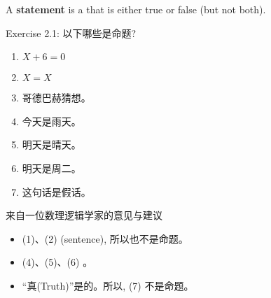 
\begin{frame}{}
\end{frame}

\begin{frame}{}
  \begin{definition}
    A \textbf{statement} is a  that is either true or false
    (but not both).
  \end{definition}

  \vspace{0.30cm}
  \pause
  \begin{exampleblock}{Exercise 2.1: 以下哪些是命题?}
    \begin{enumerate}
      \item $X + 6 = 0$
      \item $X = X$
      \item 哥德巴赫猜想。
      \item 今天是雨天。
      \item 明天是晴天。
      \item 明天是周二。
      \item 这句话是假话。
    \end{enumerate}
  \end{exampleblock}
\end{frame}

\begin{frame}{来自一位数理逻辑学家的意见与建议}
  \begin{itemize}
    \setlength{\itemsep}{8pt}
    \item<1-> (1)、(2)  (sentence), 所以也不是命题。
    \item<2-> (4)、(5)、(6) 。
    \item<3-> ``真(Truth)''是的。所以, (7) 不是命题。
  \end{itemize}

\end{frame}

